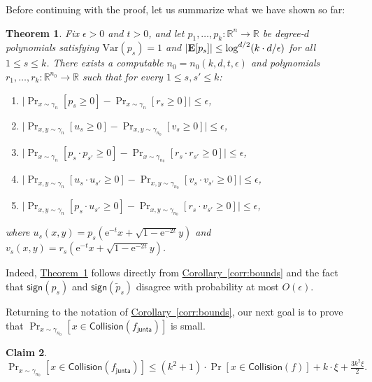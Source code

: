 \documentclass[11pt]{article}
\numberwithin{equation}{section}
\newtheorem{theorem}{Theorem}[section]
\newtheorem{claim}[theorem]{Claim}
\theoremstyle{definition}
\theoremstyle{plain}
\newcommand{\R}{\mathbb R}
\newcommand{\eee}{\mathrm e}
\newcommand{\expref}[2]{\hyperref[#2]{#1~\ref{#2}}}
\newcommand{\E}{{\bf E}}
\newcommand{\fh}{{f_{\mathsf{junta}}}}
\newcommand{\Var}{\mathrm{Var}}
\begin{document}
Before continuing with the proof, let us summarize what we have shown so far:
\begin{theorem}\label{thm:summary}
Fix $\epsilon > 0$ and $t > 0$, and let $p_1, \ldots, p_k: \mathbb{R}^n \rightarrow \mathbb{R}$ be degree-$d$ polynomials
satisfying $\Var(p_s) = 1$ and $|\E[p_s]| \le \log^{d/2} (k \cdot d/\epsilon)$ for 
all $1 \le s \le k$.
There exists a computable $n_0 = n_0(k, d, t, \epsilon)$
and polynomials $r_1, \dots, r_k: \R^{n_0} \to \R$ such that
for every $1 \le s, s' \le k$:
\begin{enumerate}
\item[(a)] $\big|\Pr_{x \sim \gamma_n} [{p}_s \ge 0] - \Pr_{x \sim \gamma_n} [{r}_s \ge 0]\big| \le \epsilon$,
\item[(b)] $\big|\Pr_{x,y \sim \gamma_{n}} [{u}_s \ge 0] - \Pr_{x,y \sim \gamma_{n_0}} [{v}_s \ge 0]\big| \le \epsilon$,
\item[(c)] $\big|\Pr_{x \sim \gamma_n} [{p}_s \cdot {p}_{s'} \ge 0] - 
\Pr_{x \sim \gamma_{n_0}} [{r}_s \cdot {r}_{s'} \ge 0]\big| \le \epsilon$,
\item[(d)] $\big|\Pr_{x,y \sim \gamma_n} [{u}_s\cdot {u}_{s'} \ge 0] - 
\Pr_{x,y \sim \gamma_{n_0}} [{v}_s \cdot {v}_{s'} \ge 0]\big| \le \epsilon$,
\item[(e)] $\big|\Pr_{x,y \sim \gamma_n} [{p}_s\cdot {u}_{s'} \ge 0] - 
\Pr_{x,y \sim \gamma_{n_0}} [{r}_s \cdot {v}_{s'} \ge 0]\big| \le \epsilon$,
\end{enumerate}
where $u_s(x, y) = p_s(\eee^{-t} x + \sqrt{1-\eee^{-2t}} y)$ and
$v_s(x, y) = r_s(\eee^{-t} x + \sqrt{1-\eee^{-2t}} y)$.
\end{theorem}

Indeed, \expref{Theorem}{thm:summary} follows directly from \expref{Corollary}{corr:bounds}
and the fact that $\mathsf{sign}(p_s)$ and $\mathsf{sign}(\tilde p_s)$ disagree with probability at most $O(\epsilon)$.

Returning to the notation of \expref{Corollary}{corr:bounds}, our next goal is to
prove
that $\Pr_{x \sim \gamma_{n_0}} [x \in \mathsf{Collision}(\fh)]$ is small.

\begin{claim}~\label{clm:collision-upper}
$\displaystyle \Pr_{x \sim \gamma_{n_0}} [x \in \mathsf{Collision}(\fh)]\le  (k^2+1) \cdot \Pr[x \in \mathsf{Collision}(f)] + k \cdot \xi + \frac{3k^2 \xi}{2}. $ \end{claim}
\end{document}
